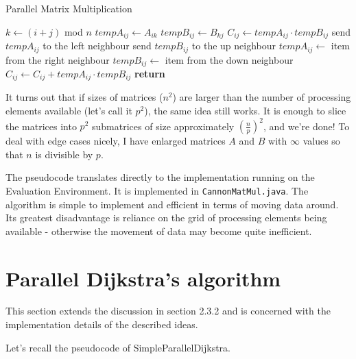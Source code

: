 \documentclass[12pt,a4paper,twoside,openright]{report}
\begin{document}
\begin{algorithm}
\caption{Parallel Matrix Multiplication}\label{matmulparallel}
\begin{algorithmic}[1]
\State $k \gets (i+j)$ mod $n$
\State $tempA_{ij} \gets A_{ik}$
\State $tempB_{ij} \gets B_{kj}$
\State $C_{ij} \gets tempA_{ij} \cdot tempB_{ij}$
\State send $tempA_{ij}$ to the left neighbour
\State send $tempB_{ij}$ to the up neighbour
\State {}
\State $tempA_{ij} \gets$ item from the right neighbour
\State $tempB_{ij} \gets$ item from the down neighbour
\State $C_{ij} \gets C_{ij} + tempA_{ij} \cdot tempB_{ij}$
\EndFor
\EndFor
\State \textbf{return} 
\EndProcedure
\end{algorithmic}
\end{algorithm}

It turns out that if sizes of matrices ($n^2$) are larger than the number of processing elements available (let's call it $p^2$), the same idea still works. It is enough to slice the matrices into $p^2$ submatrices of size approximately $(\frac{n}{p})^2$, and we're done! To deal with edge cases nicely, I have enlarged matrices $A$ and $B$ with $\infty$ values so that $n$ is divisible by $p$.

The pseudocode translates directly to the implementation running on the Evaluation Environment. It is implemented in \texttt{CannonMatMul.java}. The algorithm is simple to implement and efficient in terms of moving data around. Its greatest disadvantage is reliance on the grid of processing elements being available - otherwise the movement of data may become quite inefficient.

\section{Parallel Dijkstra's algorithm}
This section extends the discussion in section 2.3.2 and is concerned with the implementation details of the described ideas. 

Let's recall the pseudocode of SimpleParallelDijkstra.
\end{document}
